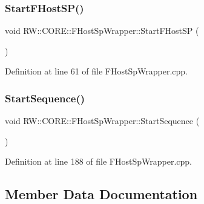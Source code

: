 \hypertarget{class_r_w_1_1_c_o_r_e_1_1_f_host_sp_wrapper_ad2daebbd1b0140480d03b31916cd6c35}{}\label{class_r_w_1_1_c_o_r_e_1_1_f_host_sp_wrapper_ad2daebbd1b0140480d03b31916cd6c35} 
\subsubsection{\texorpdfstring{Start\+F\+Host\+S\+P()}{StartFHostSP()}}
{\footnotesize\ttfamily void R\+W\+::\+C\+O\+R\+E\+::\+F\+Host\+Sp\+Wrapper\+::\+Start\+F\+Host\+SP (\begin{DoxyParamCaption}{ }\end{DoxyParamCaption})}



Definition at line 61 of file F\+Host\+Sp\+Wrapper.\+cpp.

\hypertarget{class_r_w_1_1_c_o_r_e_1_1_f_host_sp_wrapper_a718318bc9b98f97ff311f8174adfb172}{}\label{class_r_w_1_1_c_o_r_e_1_1_f_host_sp_wrapper_a718318bc9b98f97ff311f8174adfb172} 
\subsubsection{\texorpdfstring{Start\+Sequence()}{StartSequence()}}
{\footnotesize\ttfamily void R\+W\+::\+C\+O\+R\+E\+::\+F\+Host\+Sp\+Wrapper\+::\+Start\+Sequence (\begin{DoxyParamCaption}{ }\end{DoxyParamCaption})}



Definition at line 188 of file F\+Host\+Sp\+Wrapper.\+cpp.



\subsection{Member Data Documentation}
\hypertarget{class_r_w_1_1_c_o_r_e_1_1_f_host_sp_wrapper_a85c312c5d8288140d1d2a31fd15946a9}{}\label{class_r_w_1_1_c_o_r_e_1_1_f_host_sp_wrapper_a85c312c5d8288140d1d2a31fd15946a9} 

